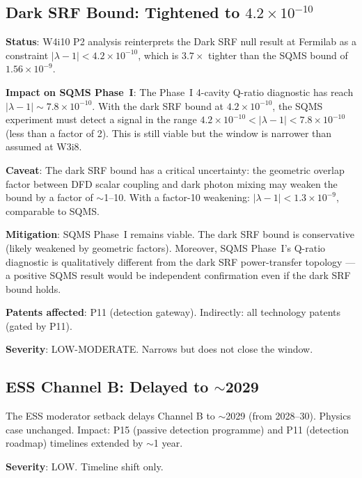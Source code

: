 \documentclass[11pt]{article}
\newcommand{\ee}[1]{\times 10^{#1}}
\newcommand{\lambdaone}{|\lambda{-}1|}
\begin{document}
\subsection{Dark SRF Bound: Tightened to $4.2\ee{-10}$}

\begin{tcolorbox}[colback=yellow!5!white, colframe=yellow!60!black,
  title=\textbf{CAUTION: Dark SRF Narrows SQMS Phase I Window}]

\textbf{Status}: W4i10 P2 analysis reinterprets the Dark SRF null result
at Fermilab as a constraint $\lambdaone < 4.2\ee{-10}$, which is
$3.7\times$ tighter than the SQMS bound of $1.56\ee{-9}$.

\textbf{Impact on SQMS Phase~I}: The Phase~I 4-cavity Q-ratio diagnostic
has reach $\lambdaone \sim 7.8\ee{-10}$. With the dark SRF bound at
$4.2\ee{-10}$, the SQMS experiment must detect a signal in the range
$4.2\ee{-10} < \lambdaone < 7.8\ee{-10}$ (less than a factor of 2).
This is still viable but the window is narrower than assumed at W3i8.

\textbf{Caveat}: The dark SRF bound has a critical uncertainty: the
geometric overlap factor between DFD scalar coupling and dark photon
mixing may weaken the bound by a factor of $\sim$1--10. With a factor-10
weakening: $\lambdaone < 1.3\ee{-9}$, comparable to SQMS.

\textbf{Mitigation}: SQMS Phase~I remains viable. The dark SRF bound
is conservative (likely weakened by geometric factors). Moreover, SQMS
Phase~I's Q-ratio diagnostic is qualitatively different from the dark SRF
power-transfer topology --- a positive SQMS result would be independent
confirmation even if the dark SRF bound holds.

\textbf{Patents affected}: P11 (detection gateway). Indirectly: all
technology patents (gated by P11).

\textbf{Severity}: LOW-MODERATE. Narrows but does not close the window.
\end{tcolorbox}

\subsection{ESS Channel B: Delayed to $\sim$2029}

The ESS moderator setback delays Channel B to $\sim$2029 (from 2028--30).
Physics case unchanged. Impact: P15 (passive detection programme) and P11
(detection roadmap) timelines extended by $\sim$1 year.

\textbf{Severity}: LOW. Timeline shift only.
\end{document}
